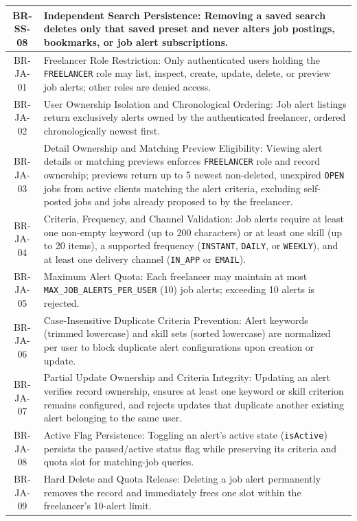 \begin{longtable}{|c|p{12cm}|}
    BR-SS-08 & Independent Search Persistence: Removing a saved search deletes only that saved preset and never alters job postings, bookmarks, or job alert subscriptions. \\ \hline
    BR-JA-01 & Freelancer Role Restriction: Only authenticated users holding the \texttt{FREELANCER} role may list, inspect, create, update, delete, or preview job alerts; other roles are denied access. \\ \hline
    BR-JA-02 & User Ownership Isolation and Chronological Ordering: Job alert listings return exclusively alerts owned by the authenticated freelancer, ordered chronologically newest first. \\ \hline
    BR-JA-03 & Detail Ownership and Matching Preview Eligibility: Viewing alert details or matching previews enforces \texttt{FREELANCER} role and record ownership; previews return up to 5 newest non-deleted, unexpired \texttt{OPEN} jobs from active clients matching the alert criteria, excluding self-posted jobs and jobs already proposed to by the freelancer. \\ \hline
    BR-JA-04 & Criteria, Frequency, and Channel Validation: Job alerts require at least one non-empty keyword (up to 200 characters) or at least one skill (up to 20 items), a supported frequency (\texttt{INSTANT}, \texttt{DAILY}, or \texttt{WEEKLY}), and at least one delivery channel (\texttt{IN\_APP} or \texttt{EMAIL}). \\ \hline
    BR-JA-05 & Maximum Alert Quota: Each freelancer may maintain at most \texttt{MAX\_JOB\_ALERTS\_PER\_USER} (10) job alerts; exceeding 10 alerts is rejected. \\ \hline
    BR-JA-06 & Case-Insensitive Duplicate Criteria Prevention: Alert keywords (trimmed lowercase) and skill sets (sorted lowercase) are normalized per user to block duplicate alert configurations upon creation or update. \\ \hline
    BR-JA-07 & Partial Update Ownership and Criteria Integrity: Updating an alert verifies record ownership, ensures at least one keyword or skill criterion remains configured, and rejects updates that duplicate another existing alert belonging to the same user. \\ \hline
    BR-JA-08 & Active Flag Persistence: Toggling an alert's active state (\texttt{isActive}) persists the paused/active status flag while preserving its criteria and quota slot for matching-job queries. \\ \hline
    BR-JA-09 & Hard Delete and Quota Release: Deleting a job alert permanently removes the record and immediately frees one slot within the freelancer's 10-alert limit. \\ \hline

\end{longtable}
